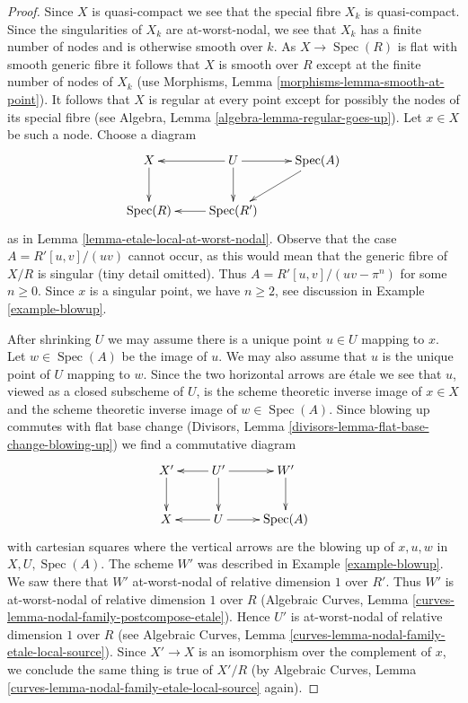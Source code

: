 \documentclass{stacks-project}
\theoremstyle{plain}
\theoremstyle{definition}
\theoremstyle{remark}
\numberwithin{equation}{subsection}
\def\Spec{\mathop{\mathrm{Spec}}}
\begin{document}
\begin{proof}
Since $X$ is quasi-compact we see that the special fibre $X_k$ is quasi-compact.
Since the singularities of $X_k$ are at-worst-nodal, we see
that $X_k$ has a finite number of nodes and is otherwise
smooth over $k$. As $X \to \Spec(R)$ is flat with smooth generic
fibre it follows that $X$ is smooth over $R$ except at the
finite number of nodes of $X_k$
(use Morphisms, Lemma \ref{morphisms-lemma-smooth-at-point}).
It follows that $X$ is regular at every point except for possibly
the nodes of its special fibre
(see Algebra, Lemma \ref{algebra-lemma-regular-goes-up}).
Let $x \in X$ be such a node.
Choose a diagram
$$
\xymatrix{
X \ar[d] &
U \ar[r] \ar[d] \ar[l] &
\Spec(A) \ar[dl] \\
\Spec(R) &
\Spec(R') \ar[l]
}
$$
as in Lemma \ref{lemma-etale-local-at-worst-nodal}.
Observe that the case $A = R'[u, v]/(uv)$ cannot
occur, as this would mean that the generic fibre of
$X/R$ is singular (tiny detail omitted). Thus $A = R'[u, v]/(uv - \pi^n)$
for some $n \geq 0$. Since $x$ is a singular point,
we have $n \geq 2$, see discussion in
Example \ref{example-blowup}.

\medskip\noindent
After shrinking $U$ we may assume there is
a unique point $u \in U$ mapping to $x$.
Let $w \in \Spec(A)$ be the image of $u$.
We may also assume that $u$ is the unique point of $U$
mapping to $w$.
Since the two horizontal arrows are \'etale
we see that $u$, viewed as a closed subscheme of $U$,
is the scheme theoretic inverse image of $x \in X$ and the
scheme theoretic inverse image of $w \in \Spec(A)$.
Since blowing up commutes with flat base change
(Divisors, Lemma \ref{divisors-lemma-flat-base-change-blowing-up})
we find a commutative diagram
$$
\xymatrix{
X' \ar[d] &
U' \ar[l] \ar[d] \ar[r] &
W' \ar[d] \\
X & U \ar[l] \ar[r] & \Spec(A)
}
$$
with cartesian squares where the vertical arrows are the blowing
up of $x, u, w$ in $X, U, \Spec(A)$. The scheme $W'$ was described
in Example \ref{example-blowup}. We saw there that $W'$
at-worst-nodal of relative dimension $1$ over $R'$. Thus
$W'$ is at-worst-nodal of relative dimension $1$ over $R$
(Algebraic Curves, Lemma \ref{curves-lemma-nodal-family-postcompose-etale}).
Hence $U'$ is at-worst-nodal of relative dimension $1$ over $R$ (see
Algebraic Curves, Lemma \ref{curves-lemma-nodal-family-etale-local-source}).
Since $X' \to X$ is an isomorphism over the complement of $x$,
we conclude the same thing is true of $X'/R$ (by
Algebraic Curves, Lemma \ref{curves-lemma-nodal-family-etale-local-source}
again).


\end{proof}
\end{document}
